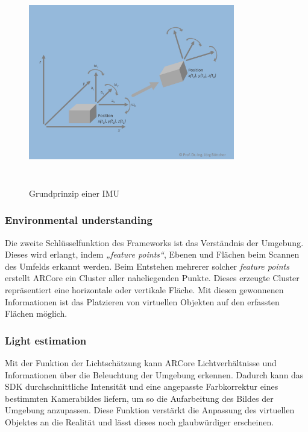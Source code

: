 \begin{figure}[hbt!]
    \centering
    \includegraphics[width=9cm,height=9cm,keepaspectratio]{2Grundlagen/Bilder/imu-Bsp.png}
    \caption{Grundprinzip einer IMU \cite{imubild.2020j}}
    \label{pic:Positionsberechnung}
\end{figure}
\subsubsection*{Environmental understanding}
Die zweite Schlüsselfunktion des Frameworks ist das Verständnis der Umgebung. Dieses wird erlangt, indem \textit{„feature points“}, Ebenen und 
Flächen beim Scannen des Umfelds erkannt werden. Beim Entstehen mehrerer solcher \textit{feature points} erstellt ARCore ein Cluster aller 
naheliegenden Punkte. Dieses erzeugte Cluster repräsentiert eine horizontale oder vertikale Fläche. Mit diesen gewonnenen Informationen ist das 
Platzieren von virtuellen Objekten auf den erfassten Flächen möglich. \cite{arcoreofficial.2020j}
\subsubsection*{Light estimation}
Mit der Funktion der Lichtschätzung kann ARCore Lichtverhältnisse und Informationen über die Beleuchtung der Umgebung erkennen. Dadurch kann das 
\acs{SDK} durchschnittliche Intensität und eine angepasste Farbkorrektur eines bestimmten Kamerabildes liefern, um so die Aufarbeitung des Bildes 
der Umgebung anzupassen. Diese Funktion verstärkt die Anpassung des virtuellen Objektes an die Realität und lässt dieses noch glaubwürdiger 
erscheinen. \cite{arcoreofficial.2020j}
